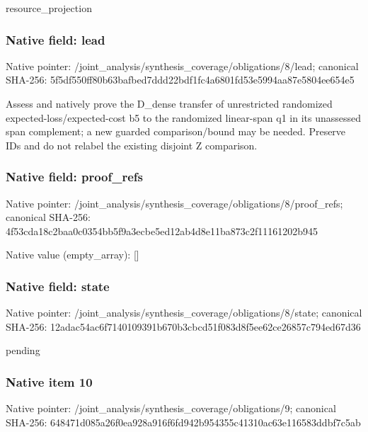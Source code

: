 \documentclass[10pt,a4paper]{article}
\begin{document}
\begingroup\raggedright\sloppy resource\_\allowbreak{}projection\par\endgroup

\subsubsection{Native field: lead}
Native pointer: /joint\_\allowbreak{}analysis/synthesis\_\allowbreak{}coverage/obligations/8/lead; canonical SHA-256: 5f5df550ff80b63bafbed7ddd22bdf1fc4a6801fd53e5994aa87e5804ee654e5

\begingroup\raggedright\sloppy Assess and natively prove the D\_\allowbreak{}dense transfer of unrestricted randomized expected-loss/\allowbreak{}expected-cost b5 to the randomized linear-span q1 in its unassessed span complement;\allowbreak{} a new guarded comparison/\allowbreak{}bound may be needed. Preserve IDs and do not relabel the existing disjoint Z comparison.\par\endgroup

\subsubsection{Native field: proof\_\allowbreak{}refs}
Native pointer: /joint\_\allowbreak{}analysis/synthesis\_\allowbreak{}coverage/obligations/8/proof\_\allowbreak{}refs; canonical SHA-256: 4f53cda18c2baa0c0354bb5f9a3ecbe5ed12ab4d8e11ba873c2f11161202b945

Native value (empty\_\allowbreak{}array): []

\subsubsection{Native field: state}
Native pointer: /joint\_\allowbreak{}analysis/synthesis\_\allowbreak{}coverage/obligations/8/state; canonical SHA-256: 12adac54ac6f7140109391b670b3cbcd51f083d8f5ee62ce26857c794ed67d36

\begingroup\raggedright\sloppy pending\par\endgroup

\subsubsection{Native item 10}
Native pointer: /joint\_\allowbreak{}analysis/synthesis\_\allowbreak{}coverage/obligations/9; canonical SHA-256: 648471d085a26f0ea928a916f6fd942b954355c41310ac63e116583ddbf7c5ab
\end{document}

